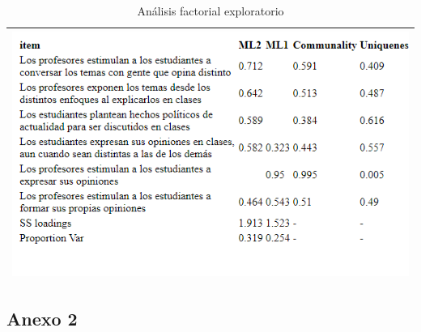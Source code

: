 \documentclass[12pt,twoside]{templates/facsothesis}
\begin{document}
\begin{longtable}[]{@{}l@{}}
\caption{\label{tab:anexo1}Análisis factorial exploratorio}\tabularnewline
\toprule()
\endhead
\includegraphics{IPO/output/tables/apdis_fa.png} \\
\bottomrule()
\end{longtable}

\hypertarget{anexo-2}{%
\subsection{Anexo 2}\label{anexo-2}}
\end{document}
